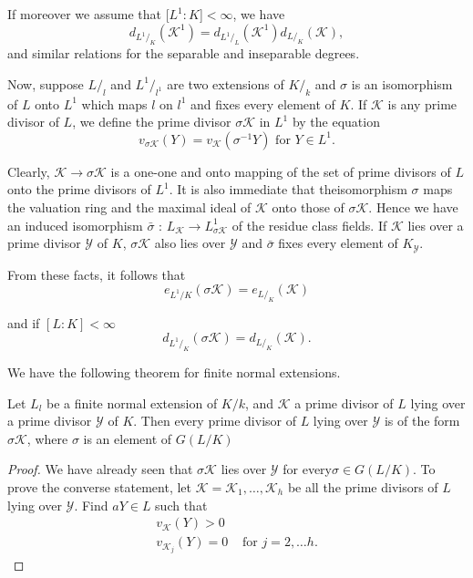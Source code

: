 If moreover we assume that [$L^1: K$]$ < \infty$, we have 
$$
d_{L^1 /_K}(\mathscr{K}^1) = d_{L^1 / _L}(\mathscr{K}^1) d_{L /_ K}(\mathscr{K}) ,
$$
and similar relations for the separable  and inseparable degrees.

Now, suppose $L/_l$ and $L^1/ _{l^1}$ are two extensions  of $K /_k$
and  $\sigma$ is an isomorphism of $L$ onto $L^1$ which maps $l$  on
$l^1$ and fixes every element of $K$. If  $\mathscr{K}$ is any  prime
divisor of $L$, we define the prime  divisor $\sigma \mathscr{K}$ in
$L^1$ by the equation 
$$
v_{\sigma \mathscr{K}} (Y) = v_{\mathscr{K}}(\sigma^{-1}Y) \text{ for } Y \in L^1.
$$

Clearly,  $\mathscr{K} \to \sigma \mathscr{K}$ is a one-one and onto
mapping of the set of prime divisors of $L$ onto the prime divisors of
$L^1$. It is also immediate that  the\pageoriginale isomorphism $\sigma$ maps the
valuation ring and the maximal ideal of $\mathscr{K}$ onto those of
$\sigma \mathscr{K}$. Hence we have an induced isomorphism
$\bar{\sigma}$ : $L_\mathscr{K} \to  L^1_{\sigma \mathscr{K}}$ of the
residue class fields.  If $\mathscr{K}$ lies over a prime divisor
$\mathscr{Y}$ of $K$, $\sigma \mathscr{K}$ also lies over
$\mathscr{Y}$ and $\bar{\sigma}$ fixes every element of
$K_\mathscr{Y}$. 

From  these facts, it follows that 
$$
e_{L^1/K} (\sigma \mathscr{K})= e_{L / _K}(\mathscr{K})
$$

and if $[L : K] <\infty$
$$
d_{L^1 / _ K} (\sigma \mathscr{K}) = d_{L / _K} (\mathscr{K}).
$$

We have the following theorem for finite  normal extensions.

\begin{theorem*}%
  Let $L_l$ be a finite normal extension  of $K/k$, and
  $\mathscr{K}$ a prime  divisor of $L$ lying over a prime divisor
  $\mathscr{Y}$ of $K$. Then  every  prime divisor  of $L$ lying over
  $\mathscr{Y}$ is of the form $\sigma \mathscr{K}$, where $\sigma$ is
  an element of $G(L/K)$ 
\end{theorem*}

\begin{proof}
  We have already seen that $\sigma \mathscr{K}$ lies over
  $\mathscr{Y}$ for every\break $\sigma \in  G(L /K)$. To prove the converse
  statement, let $\mathscr{K} = \mathscr{K}_1,\ldots ,\mathscr{K}_h$ be all
  the prime divisors of $L$ lying over $\mathscr{Y}$. Find $a Y \in L$
  such that  
  \begin{align*}
    v_{\mathscr{K}} (Y) > 0 \\
    v_{\mathscr{K}_j}(Y) = 0 & \text{ for } j=2, \ldots h .
  \end{align*}
\end{proof}

